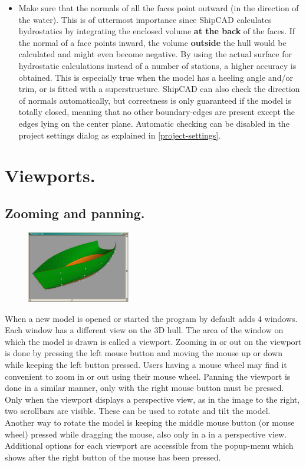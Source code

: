 \documentclass[12pt]{article}
\begin{document}
\begin{itemize}
  \item Make sure that the normals of all the faces point outward (in
the direction of the water). This is of uttermost importance since
ShipCAD calculates hydrostatics by integrating the enclosed
volume \textbf{at the back} of the faces. If the normal of a face
points inward, the volume \textbf{outside} the hull would be
calculated and might even become negative. By using the actual surface
for hydrostatic calculations instead of a number of stations, a higher
accuracy is obtained. This is especially true when the model has a
heeling angle and/or trim, or is fitted with a superstructure. ShipCAD
can also check the direction of normals automatically, but correctness
is only guaranteed if the model is totally closed, meaning that no
other boundary-edges are present except the edges lying on the center
plane. Automatic checking can be disabled in the project settings
dialog as explained in \ref{project-settings}.

\end{itemize}

\pagebreak

\section{Viewports.}

\subsection{Zooming and panning.}

\begin{figure}
        \centering
        \includegraphics[width=0.4\textwidth,natwidth=1024,natheight=715]{figure8.png}
        \caption{}
        \label{fig:viewport}
\end{figure}

When a new model is opened or started the program by default adds 4
windows. Each window has a different view on the 3D hull. The area of
the window on which the model is drawn is called a viewport. Zooming
in or out on the viewport is done by pressing the left mouse button
and moving the mouse up or down while keeping the left button pressed.
Users having a mouse wheel may find it convenient to zoom in or out
using their mouse wheel. Panning the viewport is done in a similar
manner, only with the right mouse button must be pressed. Only when
the viewport displays a perspective view, as in the image to the
right, two scrollbars are visible. These can be used to rotate and
tilt the model. Another way to rotate the model is keeping the middle
mouse button (or mouse wheel) pressed while dragging the mouse, also
only in a in a perspective view. Additional options for each viewport
are accessible from the popup-menu which shows after the right button
of the mouse has been pressed.
\end{document}

